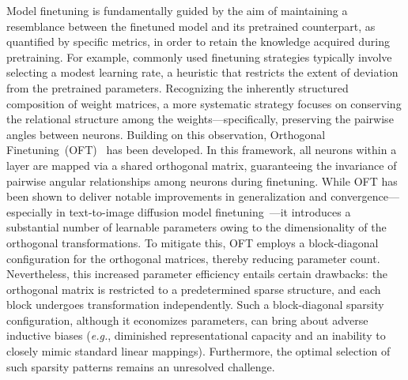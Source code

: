 Model finetuning is fundamentally guided by the aim of maintaining a resemblance between the finetuned model and its pretrained counterpart, as quantified by specific metrics, in order to retain the knowledge acquired during pretraining. For example, commonly used finetuning strategies typically involve selecting a modest learning rate, a heuristic that restricts the extent of deviation from the pretrained parameters. Recognizing the inherently structured composition of weight matrices, a more systematic strategy focuses on conserving the relational structure among the weights—specifically, preserving the pairwise angles between neurons. Building on this observation, Orthogonal Finetuning~(OFT)~\cite{qiu2023controlling} has been developed. In this framework, all neurons within a layer are mapped via a shared orthogonal matrix, guaranteeing the invariance of pairwise angular relationships among neurons during finetuning. While OFT has been shown to deliver notable improvements in generalization and convergence—especially in text-to-image diffusion model finetuning~\cite{qiu2023controlling}—it introduces a substantial number of learnable parameters owing to the dimensionality of the orthogonal transformations. To mitigate this, OFT employs a block-diagonal configuration for the orthogonal matrices, thereby reducing parameter count. Nevertheless, this increased parameter efficiency entails certain drawbacks: the orthogonal matrix is restricted to a predetermined sparse structure, and each block undergoes transformation independently. Such a block-diagonal sparsity configuration, although it economizes parameters, can bring about adverse inductive biases (\emph{e.g.}, diminished representational capacity and an inability to closely mimic standard linear mappings). Furthermore, the optimal selection of such sparsity patterns remains an unresolved challenge.

